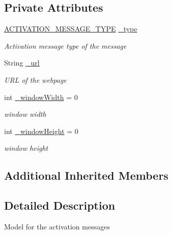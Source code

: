 \subsection*{Private Attributes}
\begin{DoxyCompactItemize}
\item 
\hyperlink{class_web_analyzer_1_1_models_1_1_message_model_1_1_activation_message_ad3b5847039dd26527a842c6f7675b1b2}{A\+C\+T\+I\+V\+A\+T\+I\+O\+N\+\_\+\+M\+E\+S\+S\+A\+G\+E\+\_\+\+T\+Y\+P\+E} \hyperlink{class_web_analyzer_1_1_models_1_1_message_model_1_1_activation_message_a108e256eff9daab288b9c8c8f18d9792}{\+\_\+type}
\begin{DoxyCompactList}\small\item\em Activation message type of the message \end{DoxyCompactList}\item 
String \hyperlink{class_web_analyzer_1_1_models_1_1_message_model_1_1_activation_message_a7d5933c3187edc115317483ad31df6b4}{\+\_\+url}
\begin{DoxyCompactList}\small\item\em U\+R\+L of the webpage \end{DoxyCompactList}\item 
int \hyperlink{class_web_analyzer_1_1_models_1_1_message_model_1_1_activation_message_a57c56a4024223834bf60bc90bce66327}{\+\_\+window\+Width} = 0
\begin{DoxyCompactList}\small\item\em window width \end{DoxyCompactList}\item 
int \hyperlink{class_web_analyzer_1_1_models_1_1_message_model_1_1_activation_message_a2c2e9dc30927ed3ee522d3a18dd4832d}{\+\_\+window\+Height} = 0
\begin{DoxyCompactList}\small\item\em window height \end{DoxyCompactList}\end{DoxyCompactItemize}
\subsection*{Additional Inherited Members}


\subsection{Detailed Description}
Model for the activation messages 



